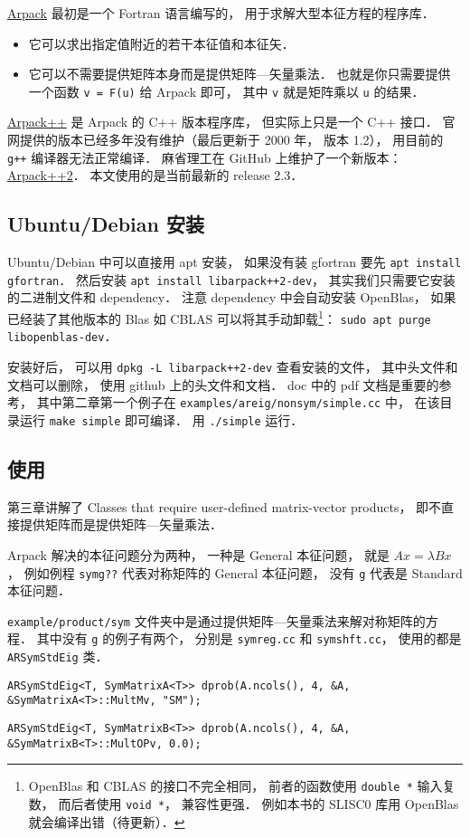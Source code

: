 
\begin{issues}
\issueDraft
\end{issues}


\href{https://www.caam.rice.edu/software/ARPACK/}{Arpack} 最初是一个 Fortran 语言编写的， 用于求解大型本征方程的程序库．
\begin{itemize}
\item 它可以求出指定值附近的若干本征值和本征矢．
\item 它可以不需要提供矩阵本身而是提供矩阵—矢量乘法． 也就是你只需要提供一个函数 \verb|v = F(u)| 给 Arpack 即可， 其中 \verb|v| 就是矩阵乘以 \verb|u| 的结果．
\end{itemize}

\href{http://www.ime.unicamp.br/~chico/arpack++/}{Arpack++} 是 Arpack 的 C++ 版本程序库， 但实际上只是一个 C++ 接口． 官网提供的版本已经多年没有维护（最后更新于 2000 年， 版本 1.2）， 用目前的 \verb|g++| 编译器无法正常编译． 麻省理工在 GitHub 上维护了一个新版本： \href{https://github.com/m-reuter/arpackpp}{Arpack++2}． 本文使用的是当前最新的 release 2.3．

\subsection{Ubuntu/Debian 安装}
Ubuntu/Debian 中可以直接用 apt 安装， 如果没有装 gfortran 要先 \verb|apt install gfortran|． 然后安装 \verb|apt install libarpack++2-dev|， 其实我们只需要它安装的二进制文件和 dependency． 注意 dependency 中会自动安装 OpenBlas， 如果已经装了其他版本的 Blas 如 CBLAS 可以将其手动卸载\footnote{OpenBlas 和 CBLAS 的接口不完全相同， 前者的函数使用 \lstinline|double *| 输入复数， 而后者使用 \verb|void *|， 兼容性更强． 例如本书的 SLISC0 库用 OpenBlas 就会编译出错（待更新）．}： \verb|sudo apt purge libopenblas-dev|．

安装好后， 可以用 \verb|dpkg -L libarpack++2-dev| 查看安装的文件， 其中头文件和文档可以删除， 使用 github 上的头文件和文档． doc 中的 pdf 文档是重要的参考， 其中第二章第一个例子在 \verb|examples/areig/nonsym/simple.cc| 中， 在该目录运行 \verb|make simple| 即可编译． 用 \verb|./simple| 运行．

\subsection{使用}
第三章讲解了 Classes that require user-defined matrix-vector products， 即不直接提供矩阵而是提供矩阵—矢量乘法．

Arpack 解决的本征问题分为两种， 一种是 General 本征问题， 就是 $Ax = \lambda Bx$， 例如例程 \verb|symg??| 代表对称矩阵的 General 本征问题， 没有 \verb|g| 代表是 Standard 本征问题．

\verb|example/product/sym| 文件夹中是通过提供矩阵—矢量乘法来解对称矩阵的方程． 其中没有 \verb|g| 的例子有两个， 分别是 \verb|symreg.cc| 和 \verb|symshft.cc|， 使用的都是 \verb|ARSymStdEig| 类．

\verb|ARSymStdEig<T, SymMatrixA<T>> dprob(A.ncols(), 4, &A, &SymMatrixA<T>::MultMv, "SM");|

\verb|ARSymStdEig<T, SymMatrixB<T>> dprob(A.ncols(), 4, &A, &SymMatrixB<T>::MultOPv, 0.0);|